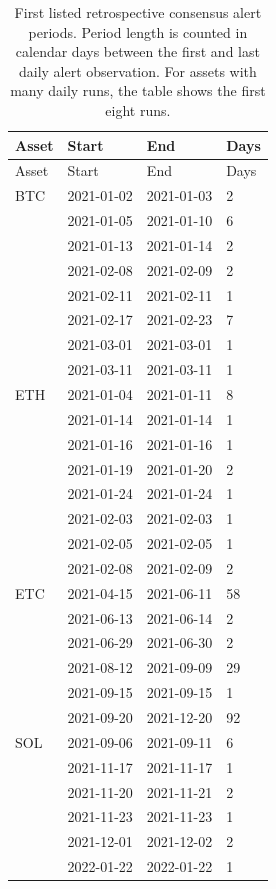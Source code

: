 \documentclass[11pt]{article}
\begin{document}
\begin{longtable}{@{}llll@{}}
\caption{First listed retrospective consensus alert periods. Period length is counted in calendar days between the first and last daily alert observation. For assets with many daily runs, the table shows the first eight runs.}\\
\toprule
Asset & Start & End & Days \\
\midrule
\endfirsthead
\toprule
Asset & Start & End & Days \\
\midrule
\endhead
BTC & 2021-01-02 & 2021-01-03 & 2 \\
 & 2021-01-05 & 2021-01-10 & 6 \\
 & 2021-01-13 & 2021-01-14 & 2 \\
 & 2021-02-08 & 2021-02-09 & 2 \\
 & 2021-02-11 & 2021-02-11 & 1 \\
 & 2021-02-17 & 2021-02-23 & 7 \\
 & 2021-03-01 & 2021-03-01 & 1 \\
 & 2021-03-11 & 2021-03-11 & 1 \\
ETH & 2021-01-04 & 2021-01-11 & 8 \\
 & 2021-01-14 & 2021-01-14 & 1 \\
 & 2021-01-16 & 2021-01-16 & 1 \\
 & 2021-01-19 & 2021-01-20 & 2 \\
 & 2021-01-24 & 2021-01-24 & 1 \\
 & 2021-02-03 & 2021-02-03 & 1 \\
 & 2021-02-05 & 2021-02-05 & 1 \\
 & 2021-02-08 & 2021-02-09 & 2 \\
ETC & 2021-04-15 & 2021-06-11 & 58 \\
 & 2021-06-13 & 2021-06-14 & 2 \\
 & 2021-06-29 & 2021-06-30 & 2 \\
 & 2021-08-12 & 2021-09-09 & 29 \\
 & 2021-09-15 & 2021-09-15 & 1 \\
 & 2021-09-20 & 2021-12-20 & 92 \\
SOL & 2021-09-06 & 2021-09-11 & 6 \\
 & 2021-11-17 & 2021-11-17 & 1 \\
 & 2021-11-20 & 2021-11-21 & 2 \\
 & 2021-11-23 & 2021-11-23 & 1 \\
 & 2021-12-01 & 2021-12-02 & 2 \\
 & 2022-01-22 & 2022-01-22 & 1 \\

\end{longtable}
\end{document}
